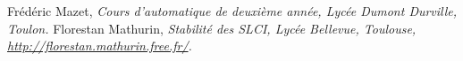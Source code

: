\documentclass[10pt,fleqn]{article} %
\begin{document}


\begin{thebibliography}{2}
    Frédéric Mazet, {\it Cours d'automatique de deuxième année, Lycée Dumont Durville, Toulon.}
       Florestan Mathurin, {\it Stabilité des SLCI, Lycée Bellevue, Toulouse, \url{http://florestan.mathurin.free.fr/}.}



\end{thebibliography}
\end{document}
